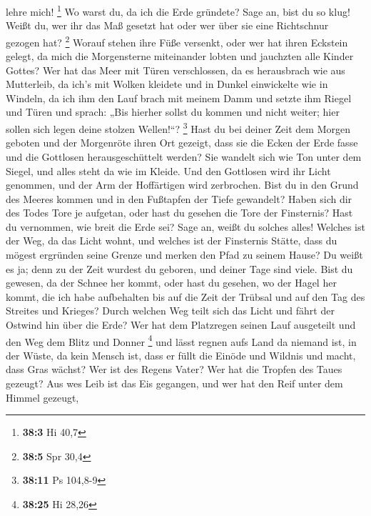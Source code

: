 lehre mich! \footnote{\textbf{38:3} Hi 40,7}  Wo warst du,
da ich die Erde gründete? Sage an, bist du so klug!  Weißt
du, wer ihr das Maß gesetzt hat oder wer über sie eine Richtschnur
gezogen hat? \footnote{\textbf{38:5} Spr 30,4}  Worauf
stehen ihre Füße versenkt, oder wer hat ihren Eckstein gelegt,
 da mich die Morgensterne miteinander lobten und jauchzten
alle Kinder Gottes?  Wer hat das Meer mit Türen
verschlossen, da es herausbrach wie aus Mutterleib,  da
ich's mit Wolken kleidete und in Dunkel einwickelte wie in Windeln,
 da ich ihm den Lauf brach mit meinem Damm und setzte ihm
Riegel und Türen  und sprach: „Bis hierher sollst du
kommen und nicht weiter; hier sollen sich legen deine stolzen
Wellen!{}``? \footnote{\textbf{38:11} Ps 104,8-9}  Hast
du bei deiner Zeit dem Morgen geboten und der Morgenröte ihren Ort
gezeigt,  dass sie die Ecken der Erde fasse und die
Gottlosen herausgeschüttelt werden?  Sie wandelt sich wie
Ton unter dem Siegel, und alles steht da wie im Kleide. 
Und den Gottlosen wird ihr Licht genommen, und der Arm der Hoffärtigen
wird zerbrochen.  Bist du in den Grund des Meeres kommen
und in den Fußtapfen der Tiefe gewandelt?  Haben sich dir
des Todes Tore je aufgetan, oder hast du gesehen die Tore der
Finsternis?  Hast du vernommen, wie breit die Erde sei?
Sage an, weißt du solches alles!  Welches ist der Weg, da
das Licht wohnt, und welches ist der Finsternis Stätte, 
dass du mögest ergründen seine Grenze und merken den Pfad zu seinem
Hause?  Du weißt es ja; denn zu der Zeit wurdest du
geboren, und deiner Tage sind viele.  Bist du gewesen, da
der Schnee her kommt, oder hast du gesehen, wo der Hagel her kommt,
 die ich habe aufbehalten bis auf die Zeit der Trübsal
und auf den Tag des Streites und Krieges?  Durch welchen
Weg teilt sich das Licht und fährt der Ostwind hin über die Erde?
 Wer hat dem Platzregen seinen Lauf ausgeteilt und den
Weg dem Blitz und Donner \footnote{\textbf{38:25} Hi 28,26}
 und lässt regnen aufs Land da niemand ist, in der Wüste,
da kein Mensch ist,  dass er füllt die Einöde und Wildnis
und macht, dass Gras wächst?  Wer ist des Regens Vater?
Wer hat die Tropfen des Taues gezeugt?  Aus wes Leib ist
das Eis gegangen, und wer hat den Reif unter dem Himmel gezeugt,
